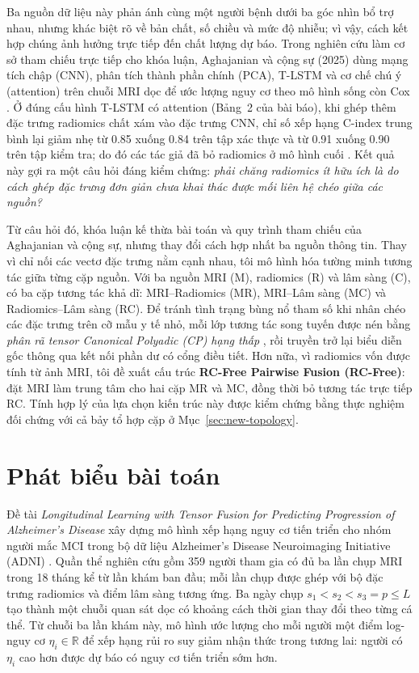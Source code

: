 Ba nguồn dữ liệu này phản ánh cùng một người bệnh dưới ba góc nhìn bổ trợ nhau, nhưng khác biệt rõ về bản chất, số chiều và mức độ nhiễu; vì vậy, cách kết hợp chúng ảnh hưởng trực tiếp đến chất lượng dự báo. Trong nghiên cứu làm cơ sở tham chiếu trực tiếp cho khóa luận, Aghajanian và cộng sự (2025) dùng mạng tích chập (CNN), phân tích thành phần chính (PCA), T-LSTM và cơ chế chú ý (attention) trên chuỗi MRI dọc để ước lượng nguy cơ theo mô hình sống còn Cox \cite{aghajanian2025longitudinal}. Ở đúng cấu hình T-LSTM có attention (Bảng~2 của bài báo), khi ghép thêm đặc trưng radiomics chất xám vào đặc trưng CNN, chỉ số xếp hạng C-index trung bình lại giảm nhẹ từ 0.85 xuống 0.84 trên tập xác thực và từ 0.91 xuống 0.90 trên tập kiểm tra; do đó các tác giả đã bỏ radiomics ở mô hình cuối \cite{aghajanian2025longitudinal}. Kết quả này gợi ra một câu hỏi đáng kiểm chứng: \emph{phải chăng radiomics ít hữu ích là do cách ghép đặc trưng đơn giản chưa khai thác được mối liên hệ chéo giữa các nguồn?}

Từ câu hỏi đó, khóa luận kế thừa bài toán và quy trình tham chiếu của Aghajanian và cộng sự, nhưng thay đổi cách hợp nhất ba nguồn thông tin. Thay vì chỉ nối các vectơ đặc trưng nằm cạnh nhau, tôi mô hình hóa tường minh tương tác giữa từng cặp nguồn. Với ba nguồn MRI (M), radiomics (R) và lâm sàng (C), có ba cặp tương tác khả dĩ: MRI--Radiomics (MR), MRI--Lâm sàng (MC) và Radiomics--Lâm sàng (RC). Để tránh tình trạng bùng nổ tham số khi nhân chéo các đặc trưng trên cỡ mẫu y tế nhỏ, mỗi lớp tương tác song tuyến được nén bằng \emph{phân rã tensor Canonical Polyadic (CP) hạng thấp} \cite{kolda2009tensor,liu2018lowrank}, rồi truyền trở lại biểu diễn gốc thông qua kết nối phần dư có cổng điều tiết. Hơn nữa, vì radiomics vốn được tính từ ảnh MRI, tôi đề xuất cấu trúc \textbf{RC-Free Pairwise Fusion (RC-Free)}: đặt MRI làm trung tâm cho hai cặp MR và MC, đồng thời bỏ tương tác trực tiếp RC. Tính hợp lý của lựa chọn kiến trúc này được kiểm chứng bằng thực nghiệm đối chứng với cả bảy tổ hợp cặp ở Mục~\ref{sec:new-topology}.

\section{Phát biểu bài toán}
Đề tài \emph{Longitudinal Learning with Tensor Fusion for Predicting Progression of Alzheimer's Disease} xây dựng mô hình xếp hạng nguy cơ tiến triển cho nhóm người mắc MCI trong bộ dữ liệu Alzheimer's Disease Neuroimaging Initiative (ADNI) \cite{weiner2015impact}. Quần thể nghiên cứu gồm 359 người tham gia có đủ ba lần chụp MRI trong 18 tháng kể từ lần khám ban đầu; mỗi lần chụp được ghép với bộ đặc trưng radiomics và điểm lâm sàng tương ứng. Ba ngày chụp $s_1<s_2<s_3=p\leq L$ tạo thành một chuỗi quan sát dọc có khoảng cách thời gian thay đổi theo từng cá thể. Từ chuỗi ba lần khám này, mô hình ước lượng cho mỗi người một điểm log-nguy cơ $\eta_i\in\mathbb R$ để xếp hạng rủi ro suy giảm nhận thức trong tương lai: người có $\eta_i$ cao hơn được dự báo có nguy cơ tiến triển sớm hơn.

